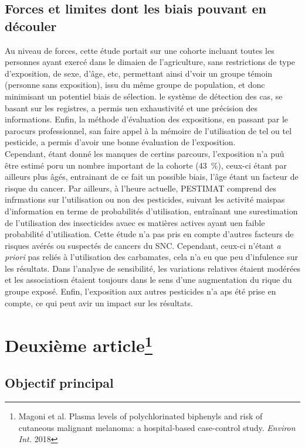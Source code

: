 \documentclass[10pt]{article}
\begin{document}
\subsection{Forces et limites dont les biais pouvant en découler}
Au niveau de forces, cette étude portait sur une cohorte incluant toutes les personnes ayant exercé dans le dimaien de l'agriculture, sans restrictions de type d'exposition, de sexe, d'âge, etc, permettant ainsi d'voir un groupe témoin (personne sans exposition), issu du même groupe de population, et donc minimisant un potentiel biais de sélection. le système de détection des cas, se basant sur les registres, a permis uen exhaustivité et une précision des informations. Enfin, la méthode d'évaluation des expositions, en passant par le parocurs professionnel, san faire appel à la mémoire de l'utilisation de tel ou tel pesticide, a permis d'avoir une bonne évaluation de l'exposition.\\
Cependant, étant donné les manques de certins parcours, l'exposition n'a puû être estimé poru un nombre important de la cohorte (43~\%), ceux-ci étant par ailleurs plus âgés, entrainant de ce fait un possible biais, l'âge étant un facteur de risque du cancer. Par ailleurs, à l'heure actuelle, PESTIMAT comprend des infrmations sur l'utilisation ou non des pesticides, suivant les activité maispas d'information en terme de probabilités d'utilisation, entraînant une surestimation de l'utilisation des insecticides avaec es matières actives ayant uen faible probabilité d'utilisation. 
Cette étude n'a pas pris en compte d'autres facteurs de risques avérés ou suspectés de cancers du SNC. Cependant, ceux-ci n'étant \emph{a priori} pas reliés à l'utilisation des carbamates, cela n'a eu que peu d'infulence sur les résultats. 
Dans l'analyse de sensibilité, les variations relatives étaient modérées  et les associatiosn étaient toujours dans le sens d'une augmentation du rique du groupe exposé. 
Enfin, l'exposition aux autres pesticides n'a aps été prise en compte, ce qui peut avir un impact sur les résultats. 
\newpage
\section{Deuxième article\protect\footnote{Magoni et al. Plasma levels of polychlorinated biphenyls and risk of cutaneous malignant melanoma: a hospital-based case-control study. \emph{Environ Int.} 2018}}
\subsection{Objectif principal}
\end{document}
